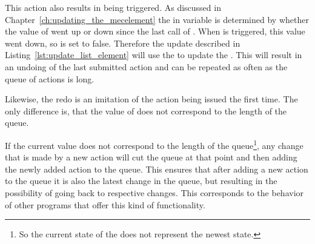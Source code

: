 This action also results in  being triggered.
As discussed in Chapter~\ref{ch:updating_the_mecelement} the  in  variable is determined by whether the value of  went up or down since the last call of .
When  is triggered, this value went down, so  is set to false.
Therefore the update described in Listing~\ref{lst:update_list_element} will use the  to update the .
This will result in an undoing of the last submitted action and can be repeated as often as the queue of actions is long.

Likewise, the redo is an imitation of the action being issued the first time.
The only difference is, that the value of  does not correspond to the length of the queue.

If the current  value does not correspond to the length of the queue\footnote{So the current state of the  does not represent the newest state.}, any change that is made by a new action will cut the queue at that point and then adding the newly added action to the queue.
This ensures that after adding a new action to the queue it is also the latest change in the queue, but resulting in the possibility of going back to respective changes.
This corresponds to the behavior of other programs that offer this kind of functionality.

